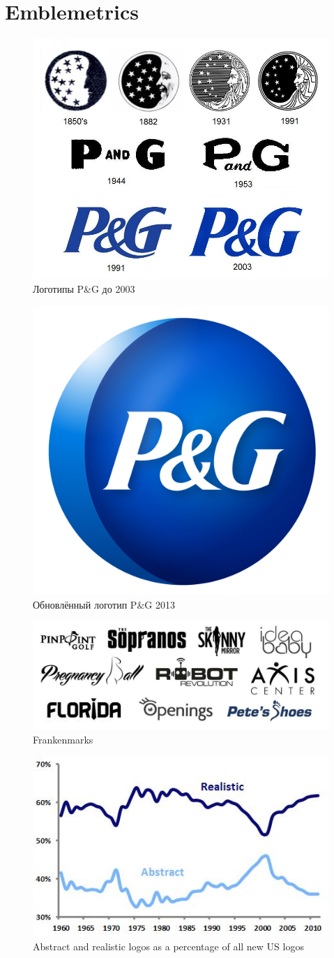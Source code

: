 \section{Emblemetrics}
\label{app:emblemetrics}

\begin{figure}[ht]
  \centering
  \includegraphics[width=.5\linewidth]{images/supplement/emblemetrics/pg2003}
  \caption[]{Логотипы P\&G до 2003}
  \label{fig:emblemetrics:pg2003}
\end{figure}

\begin{figure}[ht]
  \centering
  \includegraphics[width=.3\linewidth]{images/supplement/emblemetrics/pg2013}
  \caption[]{Обновлённый логотип P\&G 2013}
  \label{fig:emblemetrics:pg2013}
\end{figure}

\begin{figure}[ht]
  \centering
  \includegraphics[width=.5\linewidth]{images/supplement/emblemetrics/frankenmarks}
  \caption[]{Frankenmarks}
  \label{fig:emblemetrics:frankenmarks}
\end{figure}

\begin{figure}[ht]
  \centering
  \includegraphics[width=.5\linewidth]{images/supplement/emblemetrics/abstractrealistic}
  \caption[]{Abstract and realistic logos as a percentage of all new US logos}
  \label{fig:emblemetrics:abstract-realistic}
\end{figure}

